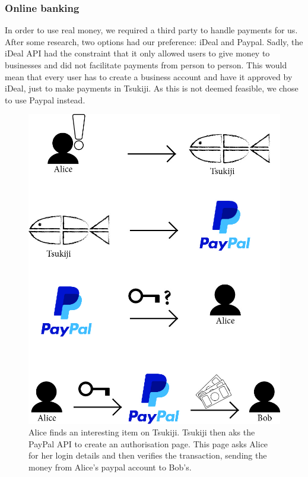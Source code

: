 \subsubsection{Online banking}
In order to use real money, we required a third party to handle payments for us. 
After some research, two options had our preference: iDeal and Paypal.
Sadly, the iDeal API had the constraint that it only allowed users to give money to businesses and did not facilitate payments from person to person.
This would mean that every user has to create a business account and have it approved by iDeal, just to make payments in Tsukiji.
As this is not deemed feasible, we chose to use Paypal instead.
\begin{figure}[H]
  \centering
  \includegraphics[width=\linewidth]{paypal-payment}
  \caption{Alice finds an interesting item on Tsukiji. Tsukiji then aks the PayPal API to create an authorisation page. This page asks Alice for her login details and then verifies the transaction, sending the money from Alice's paypal account to Bob's.}
  \label{paypal_pay}
\end{figure}

